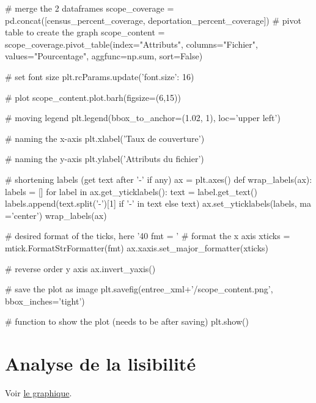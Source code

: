 \documentclass[a4paper,12pt,twoside]{book}
\begin{document}
\begin{python}
# merge the 2 dataframes
scope_coverage = pd.concat([census_percent_coverage,  deportation_percent_coverage])
# pivot table to create the graph
scope_content = scope_coverage.pivot_table(index="Attributs", columns="Fichier", values="Pourcentage", aggfunc=np.sum, sort=False)

# set font size
plt.rcParams.update({'font.size': 16})

# plot %
scope_content.plot.barh(figsize=(6,15))

# moving legend
plt.legend(bbox_to_anchor=(1.02, 1), loc='upper left')

# naming the x-axis
plt.xlabel('Taux de couverture')

# naming the y-axis
plt.ylabel('Attributs du fichier')

# shortening labels (get text after '-' if any)
ax = plt.axes()
def wrap_labels(ax):
    labels = []
    for label in ax.get_yticklabels():
        text = label.get_text()
        labels.append(text.split('-')[1] if '-' in text else text)
    ax.set_yticklabels(labels, ma ='center')
wrap_labels(ax)

# desired format of the ticks, here '40%
fmt = '%
# format the x axis
xticks = mtick.FormatStrFormatter(fmt)
ax.xaxis.set_major_formatter(xticks)

# reverse order y axis
ax.invert_yaxis()

# save the plot as image
plt.savefig(entree_xml+'/scope_content.png', bbox_inches='tight')

# function to show the plot (needs to be after saving)
plt.show()
            \end{python}

		\section{Analyse de la lisibilité}
		
		Voir \hyperref[fig12]{le graphique}.
		\label{analyse3}
\end{document}
